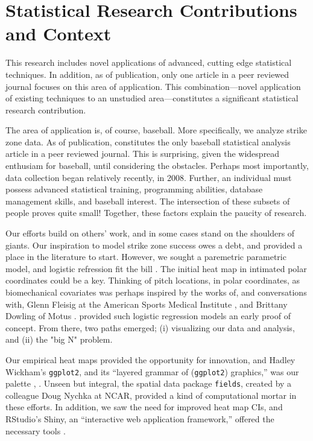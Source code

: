 \section{Statistical Research Contributions and Context}

This research includes novel applications of advanced, cutting edge statistical techniques. In addition, as of publication, only one article in a peer reviewed journal focuses on this area of application. This combination---novel application of existing techniques to an unstudied area---constitutes a significant statistical research contribution. 

The area of application is, of course, baseball. More specifically, we analyze strike zone data. As of publication, \cite{Cross2015} constitutes the only baseball statistical analysis article in a peer reviewed journal. This is surprising, given the widespread enthusiam for baseball, until considering the obstacles. Perhaps most importantly, data collection began relatively recently, in 2008. Further, an individual must possess advanced statistical training, programming abilities, database management skills, and baseball interest. The intersection of these subsets of people proves quite small!  Together, these factors explain the paucity of research.

Our efforts build on others' work, and in some cases stand on the shoulders of giants. Our inspiration to model strike zone success owes \cite{Williams1971} a debt, and \cite{Cross2015} provided a place in the literature to start. However, we sought a paremetric parametric model, and logistic refression fit the bill \citep{Myers2012}. The initial heat map in \cite{Cross2015} intimated polar coordinates could be a key. Thinking of pitch locations, in polar coordinates, as biomechanical covariates was perhaps inspired by the works of, and conversations with, Glenn Fleisig at the American Sports Medical Institute \citep{Fleisig2002}, and Brittany Dowling of Motus \citep{Dowling2016}. \cite{Hosmer2013} provided such logistic regression models an early proof of concept. From there, two  paths emerged; (i) visualizing our data and analysis, and (ii) the "big N" problem.

Our empirical heat maps provided the opportunity for innovation, and Hadley Wickham's \verb|ggplot2|, and its ``layered grammar of (\verb|ggplot2|) graphics,'' was our palette \citep{Wickham2009}, \citep{Wickham2010}. Unseen but integral, the spatial data package \verb|fields|, created by a colleague Doug Nychka at NCAR, provided a kind of computational mortar in these efforts.  In addition, we saw the need for improved heat map CIs, and RStudio's Shiny, an ``interactive web application framework,'' offered the necessary tools \citep{Shiny}.

